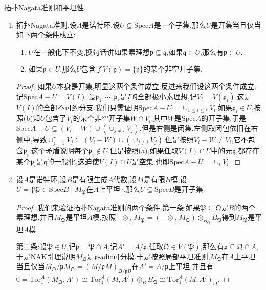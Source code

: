 拓扑Nagata准则和平坦性.
\begin{enumerate}
	\item 拓扑Nagata准则.设$A$是诺特环,设$U\subseteq\mathrm{Spec}A$是一个子集,那么$U$是开集当且仅当如下两个条件成立:
	\begin{enumerate}
		\item $U$在一般化下不变,换句话讲如果素理想$\mathfrak{p}\subseteq\mathfrak{q}$,如果$\mathfrak{q}\in U$,那么有$\mathfrak{p}\in U$.
		\item 如果$\mathfrak{p}\in U$,那么$U$包含了$V(\mathfrak{p})=\overline{\{\mathfrak{p}\}}$的某个非空开子集.
	\end{enumerate}
    \begin{proof}
    	
    	如果$U$本身是开集,明显这两个条件成立.反过来我们设这两个条件成立.记$\overline{\mathrm{Spec}A-U}=V(I)$.设$\mathfrak{p}_1,\cdots,\mathfrak{p}_r$是$I$的全部极小素理想,记$V_i=V(\mathfrak{p}_i)$,这是$V(I)$的全部不可约分支.我们只需证明$\mathrm{Spec}A-U=\cup_{1\le i\le r}V_i$.如果$\mathfrak{p}_i\in U$,按照(b)知$U$包含了$V_i$的某个非空开子集$W\cap V_i$,其中$W$是$\mathrm{Spec}A$的开子集.于是$\mathrm{Spec}A-U\subseteq(V_i-W)\cup\left(\cup_{j\not=i}V_j\right)$.但是右侧是闭集,左侧取闭包依旧在右侧中,导致$\cup_{j=1}^rV_j\subseteq(V_i-W)\cup\left(\cup_{j\not=i}V_j\right)$.但是按照$V_i-W\not=V_i$,它不包含$\mathfrak{p}_i$.这个矛盾说明每个$\mathfrak{p}_i\not\in U$.但是按照(a),如果任取$V(I)\cap U$中的元$\mathfrak{q}$,都存在某个$\mathfrak{p}_i$是$\mathfrak{q}$的一般化,这迫使$V(I)\cap U$是空集,也即$\mathrm{Spec}A-U=\cup_iV_i$.
    \end{proof}
    \item 设$A$是诺特环,设$B$是有限生成$A$代数,设$M$是有限$B$模,设$U=\{\mathfrak{P}\in\mathrm{Spec}B\mid M_{\mathfrak{P}}\text{在}A\text{上平坦}\}$,那么$U\subseteq\mathrm{Spec}B$是开子集.
    \begin{proof}
    	
    	我们来验证拓扑Nagata准则的两个条件.第一条:如果$\mathfrak{P}\subseteq\mathfrak{Q}$是$B$的两个素理想,并且$M_{\mathfrak{Q}}$是平坦$A$模,按照$-\otimes_AM_{\mathfrak{P}}=(-\otimes_AM_{\mathfrak{Q}})\otimes_{B_{\mathfrak{Q}}}B_{\mathfrak{P}}$得到$M_{\mathfrak{P}}$是平坦$A$模.
    	
    	\qquad
    	
    	第二条:设$\mathfrak{P}\in U$,记$\mathfrak{p}=\mathfrak{P}\cap A$,记$A'=A/\mathfrak{p}$.任取$\mathfrak{Q}\in V(\mathfrak{P})$,那么有$\mathfrak{p}\subseteq\mathfrak{Q}\cap A$,于是NAK引理说明$M_{\mathfrak{Q}}$是$\mathfrak{p}$-adic可分模.于是按照局部平坦准则,$M_{\mathfrak{Q}}$在$A$上平坦当且仅当$M_{\mathfrak{Q}}/\mathfrak{p}M_{\mathfrak{Q}}=(M/\mathfrak{p}M)_{\mathfrak{Q}/\mathfrak{p}B}$在$A'=A/\mathfrak{p}$上平坦,并且有$0=\mathrm{Tor}_1^A(M_{\mathfrak{Q}},A')\cong\mathrm{Tor}_1^A(M,A')\otimes_BB_{\mathfrak{Q}}\cong\mathrm{Tor}_1^A(M,A')_{\mathfrak{Q}}$.
    	

\end{proof}
\end{enumerate}
